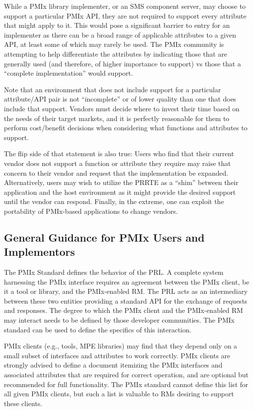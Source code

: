 While a \ac{PMIx} library implementer, or an \ac{SMS} component server, may choose to support a particular \ac{PMIx} \ac{API}, they are not required to support every attribute that might apply to it. This would pose a significant barrier to entry for an implementer as there can be a broad range of applicable attributes to a given \ac{API}, at least some of which may rarely be used. The \ac{PMIx} community is attempting to help differentiate the attributes by indicating those that are generally used (and therefore, of higher importance to support) vs those that a ``complete implementation'' would support.

Note that an environment that does not include support for a particular attribute/\ac{API} pair is not ``incomplete'' or of lower quality than one that does include that support. Vendors must decide where to invest their time based on the needs of their target markets, and it is perfectly reasonable for them to perform cost/benefit decisions when considering what functions and attributes to support.

The flip side of that statement is also true: Users who find that their current vendor does not support a function or attribute they require may raise that concern to their vendor and request that the implementation be expanded. Alternatively, users may wish to utilize the \ac{PRRTE} as a ``shim'' between their application and the host environment as it might provide the desired support until the vendor can respond. Finally, in the extreme, one can exploit the portability of PMIx-based applications to change vendors.

\subsection{General Guidance for PMIx Users and Implementors}

The \ac{PMIx} Standard defines the behavior of the \acf{PRL}.
A complete system harnessing the \ac{PMIx} interface requires an agreement between the \ac{PMIx} client, be it a tool or library, and the \ac{PMIx}-enabled \ac{RM}.
The \ac{PRL} acts as an intermediary between these two entities providing a standard API for the exchange of requests and responses.
The degree to which the \ac{PMIx} client and the \ac{PMIx}-enabled \ac{RM} may interact needs to be defined by those developer communities.
The \ac{PMIx} standard can be used to define the specifics of this interaction.

\ac{PMIx} clients (e.g., tools, \ac{MPE} libraries) may find that they depend only on a small subset of interfaces and attributes to work correctly.
\ac{PMIx} clients are strongly advised to define a document itemizing the \ac{PMIx} interfaces and associated attributes that are required for correct operation, and are optional but recommended for full functionality.
The \ac{PMIx} standard cannot define this list for all given \ac{PMIx} clients, but such a list is valuable to \acp{RM} desiring to support these clients.


